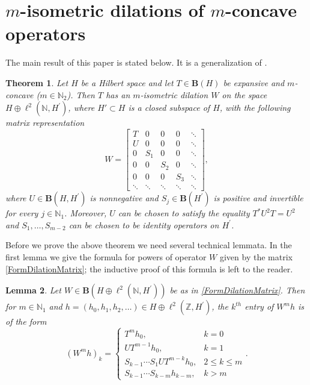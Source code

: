\documentclass{amsart}
\renewcommand{\le}{\leqslant}
\newtheorem{theorem}{Theorem}[section]
\newtheorem{lemma}[theorem]{Lemma}
\theoremstyle{definition}
\numberwithin{equation}{section}
\begin{document}
\section{$ m $-isometric dilations of $ m $-concave operators}
\label{SecMIsomDilations}
The main result of this paper is stated below. It is a generalization of \cite[Theorem 3.1]{suciuCouplingOfOperatorsWith2IsometriesIn3IsometricLiftings}.
\begin{theorem}
    \label{ThmDilationOfMConcave}
    Let $ H $ be a Hilbert space and let $ T\in \mathbf{B}(H) $ be expansive and $ m $-concave ($ m\in \mathbb{N}_{2} $). Then $ T $ has an $ m $-isometric dilation $ W $ on the space $ H\oplus \ell^{2}(\mathbb{N}, H^{\prime}) $, where $ H' \subset H $ is a closed subspace of $ H $, with the following matrix representation
    \begin{equation}
        \label{FormDilationMatrix}
        W = \begin{bmatrix}
            T & 0 & 0 & 0 &  \ddots\\
            U & 0 & 0 & 0 &  \ddots\\
            0 & S_{1} & 0 & 0 &  \ddots \\
            0 & 0 & S_{2} & 0 &  \ddots\\
            0 & 0 & 0 & S_{3} &  \ddots\\
            \ddots & \ddots & \ddots & \ddots & \ddots
        \end{bmatrix},
    \end{equation}
    where $ U\in \mathbf{B}(H,H^{\prime}) $ is nonnegative and $ S_{j}\in \mathbf{B}(H^{\prime}) $ is positive and invertible for every $ j\in \mathbb{N}_{1} $. Moreover, $ U $ can be chosen to satisfy the equality $ T^{\ast}U^{2}T = U^{2} $ and $ S_{1},\ldots,S_{m-2} $ can be chosen to be identity operators on $ H^{\prime} $.
\end{theorem}
Before we prove the above theorem we need several technical lemmata. In the first lemma we give the formula for powers of operator $ W $ given by the matrix \eqref{FormDilationMatrix}; the inductive proof of this formula is left to the reader.
\begin{lemma}
    \label{LemMatrixRepresentationOfPowers}
    Let $ W\in \mathbf{B}(H\oplus\ell^{2}(\mathbb{N},H^{\prime})) $ be as in \eqref{FormDilationMatrix}. Then for $ m\in \mathbb{N}_{1} $ and $ h = (h_{0},h_{1},h_{2},\ldots)\in H\oplus \ell^{2}(\mathbb{Z},H^{\prime}) $, the $ k^{th} $ entry of $ W^{m}h $ is of the form
    \begin{equation}
        \label{FormDilationMatrixPowers}
        (W^{m}h)_{k} = \begin{cases}
            T^{m}h_{0}, & k = 0\\
            UT^{m-1}h_{0}, & k = 1\\
            S_{k-1}\cdots S_{1}UT^{m-k}h_{0}, & 2\le k \le m\\
            S_{k-1}\cdots S_{k-m}h_{k-m}, & k > m
        \end{cases}.
    \end{equation}
\end{lemma}
\end{document}
